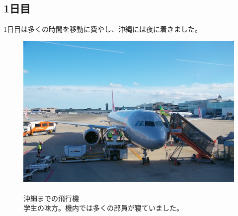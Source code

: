 \documentclass[../main]{subfiles}
\begin{document}
\subsection{1日目}
1日目は多くの時間を移動に費やし、沖縄には夜に着きました。\\
\begin{figure}[H]
  \begin{minipage}[b]{0.59\columnwidth}
    \centering
    \includegraphics[width=\columnwidth]{figure/hikouki.jpg}
  \end{minipage}
  \hspace{0.04\columnwidth} %
  \begin{minipage}[b]{0.38\columnwidth}
    \caption{\\
    沖縄までの飛行機\\
    学生の味方。機内では多くの部員が寝ていました。
    }
  \end{minipage}
\end{figure}
\end{document}
